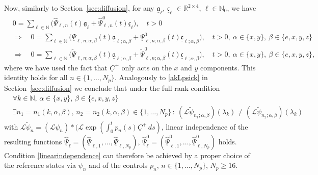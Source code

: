 \documentclass[12pt]{article}
\newcommand\ulC{\underline{C}}
\newcommand\ulPsi{\underline{\Psi}}
\newcommand\Ncont{N_p}
\begin{document}
Now, similarly to Section~\ref{sec:diffusion}, for any 
$\underline{\mathfrak{a}}_\ell$, $\underline{\mathfrak{c}}_\ell$ $\in\mathbb{R}^{2\times4}$, $\ell\in\mathbb{N}_0$, we have  
\[
\begin{aligned}
&0=\sum_{\ell\in\mathbb{N}} \bigl( \hat{\Psi}_{\ell,n}(t)\underline{\mathfrak{a}}_\ell+\hat{\Psi}_{\ell,n}^0(t)\underline{\mathfrak{c}}_\ell\bigr), 
\quad t>0%
\\
&\Rightarrow \quad 
0=\sum_{\ell\in\mathbb{N}} \bigl( 
\ulPsi_{\ell,n;\alpha,\beta}(t)\underline{\mathfrak{a}}_{\ell;\alpha,\beta}
+\ulPsi_{\ell,n;\alpha,\beta}^0(t)\underline{\mathfrak{c}}_{\ell;\alpha,\beta}\bigr), 
\quad t>0, \ 
\alpha\in\{x,y\}, \ \beta\in\{e,x,y,z\}\\
&\Rightarrow \quad 
0=\sum_{\ell\in\mathbb{N}} \bigl( 
\tilde{\ulPsi}_{\ell,n;\alpha,\beta}(t)\underline{\mathfrak{a}}_{\ell;\alpha,\beta}+\tilde{\ulPsi}_{\ell,n;\alpha,\beta}^0(t)\underline{\mathfrak{c}}_{\ell;\alpha,\beta}\bigr), 
\quad t>0, \
 \alpha\in\{x,y\}, \ \beta\in\{e,x,y,z\},
\end{aligned}
\]
where we have used the fact that $\ulC^+$ only acts on the $x$ and $y$ components. This identity holds for all $n\in\{1,\ldots,\Ncont\}$.
Analogously to \eqref{akLpsick} in Section~\ref{sec:diffusion} we conclude that
under the full rank condition 
\begin{equation}\label{fullrankBT}
\begin{aligned}
&\forall k\in\mathbb{N}, \, \alpha\in\{x,y\}, \, \beta\in\{e,x,y,z\}\, \\
&\exists n_1=n_1(k,\alpha,\beta),\,n_2=n_2(k,\alpha,\beta)\in\{1,\ldots,\Ncont\}
\,: \ 
(\mathcal{L}\tilde{\psi}_{n_1;\alpha,\beta})(\lambda_k)\not=(\mathcal{L}\tilde{\psi}_{n_2;\alpha,\beta})(\lambda_k)
\end{aligned}
\end{equation}
with $\mathcal{L}\tilde{\psi}_n=(\mathcal{L}\psi_n)*(\mathcal{L}\exp\left(\int_0^tp_n(s)\ulC^+\, ds\right)$, 
linear independence of the resulting functions 
$\hat{\ulPsi}_\ell=(\hat{\ulPsi}_{\ell,1},\ldots,\hat{\ulPsi}_{\ell,\Ncont})$, $\hat{\ulPsi}_\ell^0=(\hat{\ulPsi}_{\ell,1}^0,\ldots,\hat{\ulPsi}_{\ell,\Ncont}^0)$ holds. 
Condition \eqref{linearindependence} can therefore be achieved by a proper choice of the reference states via $\psi_n$ and of the controls $p_n$, $n\in\{1,\ldots,\Ncont\}$,  
$\Ncont\geq16$.
\end{document}
